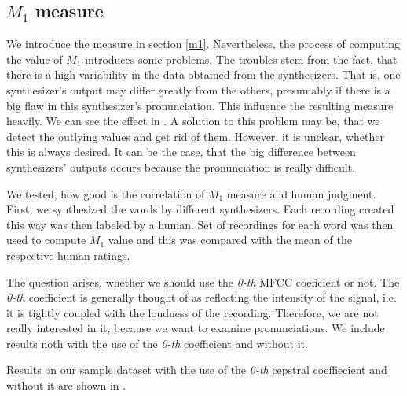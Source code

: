 \subsection{$M_1$ measure}
We introduce the measure in section \ref{m1}.
Nevertheless, the process of computing the value of $M_1$ introduces some problems. The troubles stem from the fact, that there is a high variability in the data obtained from the synthesizers.
That is, one synthesizer's output may differ greatly from the others, presumably if there is a big flaw in this synthesizer's pronunciation.
This influence the resulting measure heavily.
We can see the effect in .
A solution to this problem may be, that we detect the outlying values and get rid of them.
However, it is unclear, whether this is always desired.
It can be the case, that the big difference between synthesizers' outputs occurs because the pronunciation is really difficult.
\par
We tested, how good is the correlation of $M_1$ measure and human judgment. First, we synthesized the words by different synthesizers. Each recording created this way was then labeled by a human. Set of recordings for each word was then used to compute $M_1$ value and this was compared with the mean of the respective human ratings.
\par
The question arises, whether we should use the \textit{0-th} MFCC coeficient or not.
The \textit{0-th} coefficient is generally thought of as reflecting the intensity of the signal, i.e. it is tightly coupled with the loudness of the recording.
Therefore, we are not really interested in it, because we want to examine pronunciations.
We include results noth with the use of the \textit{0-th} coefficient and without it.
\par
Results on our sample dataset with the use of the \textit{0-th} cepstral coeffiecient and without it are shown in .
